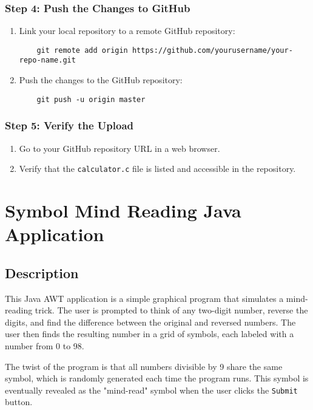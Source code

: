 \documentclass[a4paper,12pt]{article}
\begin{document}
\subsubsection{Step 4: Push the Changes to GitHub}
\begin{enumerate}
    \item Link your local repository to a remote GitHub repository:
    \begin{verbatim}
    git remote add origin https://github.com/yourusername/your-repo-name.git
    \end{verbatim}
    \item Push the changes to the GitHub repository:
    \begin{verbatim}
    git push -u origin master
    \end{verbatim}
\end{enumerate}

\subsubsection{Step 5: Verify the Upload}
\begin{enumerate}
    \item Go to your GitHub repository URL in a web browser.
    \item Verify that the \texttt{calculator.c} file is listed and accessible in the repository.
\end{enumerate}


\section{Symbol Mind Reading Java Application}

\subsection{Description}
This Java AWT application is a simple graphical program that simulates a mind-reading trick. The user is prompted to think of any two-digit number, reverse the digits, and find the difference between the original and reversed numbers. The user then finds the resulting number in a grid of symbols, each labeled with a number from 0 to 98.

The twist of the program is that all numbers divisible by 9 share the same symbol, which is randomly generated each time the program runs. This symbol is eventually revealed as the "mind-read" symbol when the user clicks the \texttt{Submit} button.
\end{document}
